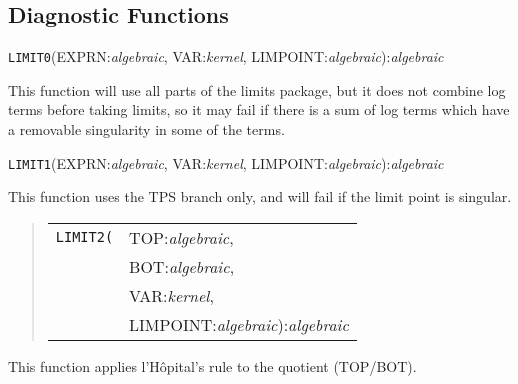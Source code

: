 \subsection{Diagnostic Functions}

\hypertarget{operator:LIMIT0}{}
\vspace{.1in}
\noindent \texttt{LIMIT0}(EXPRN:{\em algebraic}, VAR:{\em kernel},
LIMPOINT:{\em algebraic}):{\em algebraic}
\vspace{.1in}

This function will use all parts of the limits package, but it does not
combine log terms before taking limits, so it may fail if there is a sum
of log terms which have a removable singularity in some of the terms.

\vspace{.1in}
\noindent \texttt{LIMIT1}(EXPRN:{\em algebraic}, VAR:{\em kernel},
LIMPOINT:{\em algebraic}):{\em algebraic}
\vspace{.1in}

This function uses the TPS branch only, and will fail if the limit point is
singular.

\hypertarget{operator:LIMIT2}{}
\begin{quote}
\begin{tabular}{l@{}l}
\texttt{LIMIT2(} & TOP:{\em algebraic}, \\
&BOT:{\em algebraic}, \\
&VAR:{\em kernel}, \\
&LIMPOINT:{\em algebraic}):{\em algebraic}
\end{tabular}
\end{quote}

This function applies l'H\^opital's rule to the quotient (TOP/BOT).

